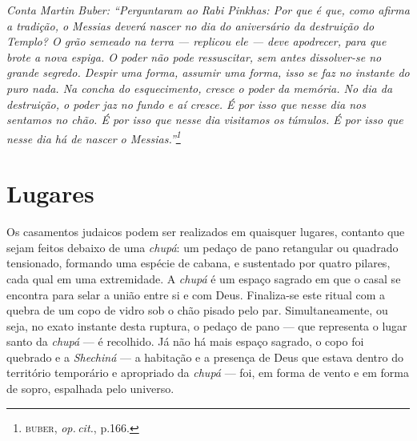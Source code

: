 
\blankpage
\pagebreak

{
\thispagestyle{empty}

\mbox{}

\vspace{11cm}

\footnotesize
\noindent{}\emph{\noindent{}Conta Martin Buber: ``Perguntaram ao Rabi Pinkhas: Por que é que, como afirma a tradição, o Messias deverá nascer no dia do aniversário da destruição do Templo? O grão semeado na terra --- replicou ele --- deve apodrecer, para que brote a nova espiga. O poder não pode ressuscitar, sem antes dissolver-se no grande segredo. Despir uma forma, assumir uma forma, isso se faz no instante do puro nada. Na concha do esquecimento, cresce o poder da memória. No dia da destruição, o poder jaz no fundo e aí cresce. É por isso que nesse dia nos sentamos no chão. É por isso que nesse dia visitamos os túmulos. É por isso que nesse dia há de nascer o Messias.''\footnote{\textsc{buber}, \emph{op.\,cit.}, p.166.}}
}

\pagebreak

\chapter{Lugares}


Os casamentos judaicos podem ser realizados em quaisquer lugares,
contanto que sejam feitos debaixo de uma \emph{chupá}: um pedaço de pano
retangular ou quadrado tensionado, formando uma espécie de cabana, e
sustentado por quatro pilares, cada qual em uma extremidade. A
\emph{chupá} é um espaço sagrado em que o casal se encontra para selar a
união entre si e com Deus. Finaliza-se este ritual com a quebra de um
copo de vidro sob o chão pisado pelo par. Simultaneamente, ou seja, no
exato instante desta ruptura, o pedaço de pano --- que representa o
lugar santo da \emph{chupá} --- é recolhido. Já não há mais espaço
sagrado, o copo foi quebrado e a \emph{Shechiná} --- a habitação e a
presença de Deus que estava dentro do território temporário e apropriado
da \emph{chupá} --- foi, em forma de vento e em forma de sopro,
espalhada pelo universo.

